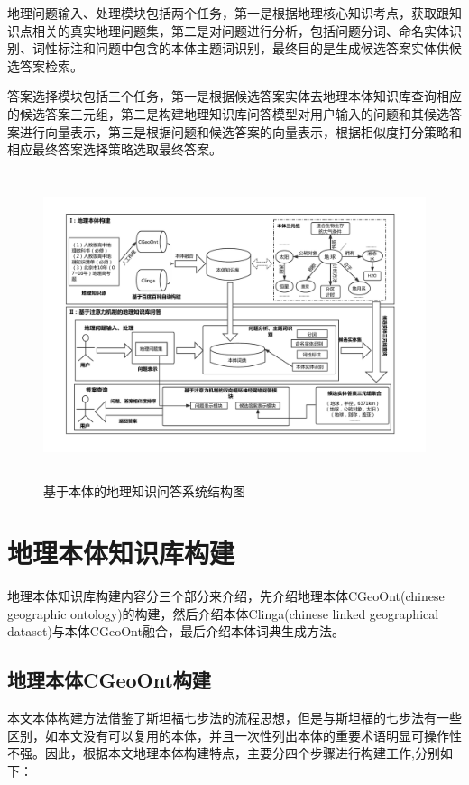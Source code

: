 地理问题输入、处理模块包括两个任务，第一是根据地理核心知识考点，获取跟知识点相关的真实地理问题集，第二是对问题进行分析，包括问题分词、命名实体识别、词性标注和问题中包含的本体主题词识别，最终目的是生成候选答案实体供候选答案检索。

答案选择模块包括三个任务，第一是根据候选答案实体去地理本体知识库查询相应的候选答案三元组，第二是构建地理知识库问答模型对用户输入的问题和其候选答案进行向量表示，第三是根据问题和候选答案的向量表示，根据相似度打分策略和相应最终答案选择策略选取最终答案。

\begin{figure}[!htb]
	\centering\includegraphics[height=9cm]{resource/graduation}
	\caption{基于本体的地理知识问答系统结构图}
	\label{fig:graduation}
\end{figure}

\section{地理本体知识库构建}
地理本体知识库构建内容分三个部分来介绍，先介绍地理本体CGeoOnt(chinese geographic ontology)的构建，然后介绍本体Clinga(chinese linked geographical dataset)与本体CGeoOnt融合，最后介绍本体词典生成方法。

\subsection{地理本体CGeoOnt构建}\label{section:CGeoOnt_build}
本文本体构建方法借鉴了斯坦福七步法的流程思想，但是与斯坦福的七步法有一些区别，如本文没有可以复用的本体，并且一次性列出本体的重要术语明显可操作性不强。因此，根据本文地理本体构建特点，主要分四个步骤进行构建工作,分别如下：

